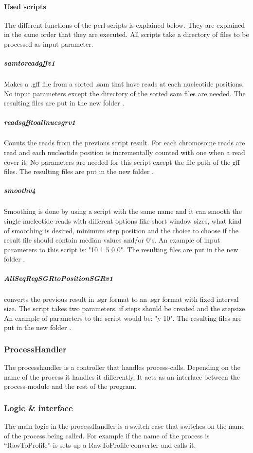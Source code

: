 \paragraph{Used scripts}
The different functions of the perl scripts is explained below. They are explained in the same order that they are executed. All scripts take a directory of files to be processed as input parameter.


\subparagraph*{samtoreadgffv1} Makes a .gff file from a sorted .sam that have reads at each nucleotide positions. No input parameters except the directory of the sorted sam files are needed. The resulting files are put in the new folder .

\subparagraph*{readsgfftoallnucsgrv1}  Counts the reads from the previous script result. For each chromosome reads are read and each nucleotide position is incrementally counted with one when a read cover it. No parameters are needed for this script except the file path of the gff files. The resulting files are put in the new folder .

\subparagraph*{smoothv4} Smoothing is done by using a script with the same name and it can smooth the single nucleotide reads with different options like short window sizes, what kind of smoothing is desired, minimum step position and the choice to choose if the result file should contain median values and/or 0’s. An example of input parameters to this script is: "10 1 5 0 0". The resulting files are put in the new folder .

\subparagraph*{AllSeqRegSGRtoPositionSGRv1}  converts the previous result in .sgr format to an .sgr format with fixed interval size. The script takes two parameters, if steps should be created and the stepsize. An example of parameters to the script would be: "y 10". The resulting files are put in the new folder .



\subsubsection{ProcessHandler}
The processhandler is a controller that handles process-calls. Depending on the name of the process it handles it differently. It acts as an interface between the process-module and the rest of the program. 


\subsubsection{Logic \& interface}
The main logic in the processHandler is a switch-case that switches on the name of the process being called. For example if the name of the process is “RawToProfile” is sets up a RawToProfile-converter and calls it. 

